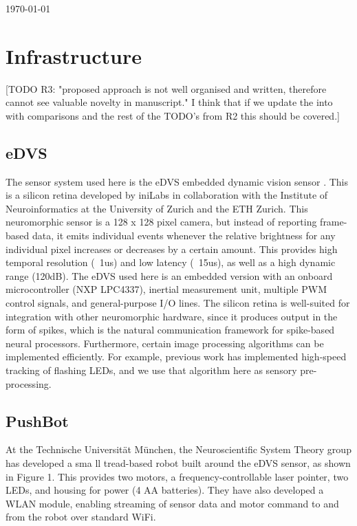 \documentclass[conference]{IEEEtran}
\begin{document}
 
\hfill \today

\section{Infrastructure}

[TODO R3: "proposed approach is not well organised and written, therefore cannot see valuable novelty in manuscript." I think that if we update the into with comparisons and the rest of the TODO's from R2 this should be covered.]

\subsection{eDVS}
The sensor system used here is the eDVS embedded dynamic vision sensor \cite{conradt2009embedded}. This is a silicon retina developed by iniLabs in collaboration with the Institute of Neuroinformatics at the University of Zurich and the ETH Zurich. This neuromorphic sensor is a 128 x 128 pixel camera, but instead of reporting frame-based data, it emits individual events whenever the relative brightness for any individual pixel increases or decreases by a certain amount. This provides high temporal resolution (~1us) and low latency (~15us), as well as a high dynamic range (120dB). The eDVS used here is an embedded version with an onboard microcontroller (NXP LPC4337), inertial measurement unit, multiple PWM control signals, and general-purpose I/O lines. The silicon retina is well-suited for integration with other neuromorphic hardware, since it produces output in the form of spikes, which is the natural communication framework for spike-based neural processors. Furthermore, certain image processing algorithms can be implemented efficiently. For example, previous work \cite{muller2011miniature} has implemented high-speed tracking of flashing LEDs, and we use that algorithm here as sensory pre-processing.


\subsection{PushBot}
At the Technische Universit{\"a}t M{\"u}nchen, the Neuroscientific
System Theory group has developed a sma ll tread-based robot built around the eDVS sensor, as shown in Figure 1. This provides two motors, a frequency-controllable laser pointer, two LEDs, and housing for power (4 AA batteries). They have also developed a WLAN module, enabling
streaming of sensor data and motor command to and from the robot over standard WiFi.
\end{document}
